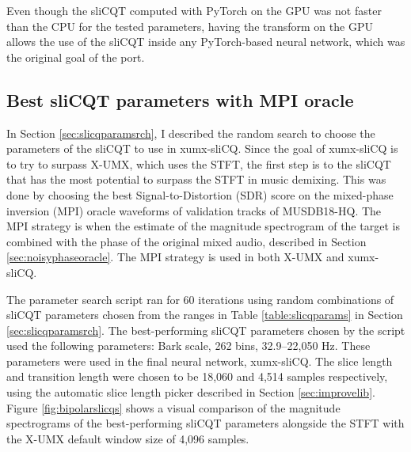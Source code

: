 \documentclass[report.tex]{subfiles}
\begin{document}

Even though the sliCQT computed with PyTorch on the GPU was not faster than the CPU for the tested parameters, having the transform on the GPU allows the use of the sliCQT inside any PyTorch-based neural network, which was the original goal of the port.

\subsection{Best sliCQT parameters with MPI oracle}
\label{sec:slicqparamresults}

In Section \ref{sec:slicqparamsrch}, I described the random search to choose the parameters of the sliCQT to use in xumx-sliCQ. Since the goal of xumx-sliCQ is to try to surpass X-UMX, which uses the STFT, the first step is to  the sliCQT that has the most potential to surpass the STFT in music demixing. This was done by choosing the best Signal-to-Distortion (SDR) score on the mixed-phase inversion (MPI) oracle waveforms of validation tracks of MUSDB18-HQ. The MPI strategy is when the estimate of the magnitude spectrogram of the target is combined with the phase of the original mixed audio, described in Section \ref{sec:noisyphaseoracle}. The MPI strategy is used in both X-UMX and xumx-sliCQ.

The parameter search script ran for 60 iterations using random combinations of sliCQT parameters chosen from the ranges in Table \ref{table:slicqparams} in Section \ref{sec:slicqparamsrch}. The best-performing sliCQT parameters chosen by the script used the following parameters: Bark scale, 262 bins, 32.9--22,050 Hz. These parameters were used in the final neural network, xumx-sliCQ. The slice length and transition length were chosen to be 18,060 and 4,514 samples respectively, using the automatic slice length picker described in Section \ref{sec:improvelib}. Figure \ref{fig:bipolarslicqs} shows a visual comparison of the magnitude spectrograms of the best-performing sliCQT parameters alongside the STFT with the X-UMX default window size of 4,096 samples.
\end{document}

